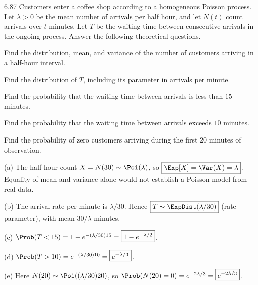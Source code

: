 \documentclass[11pt,oneside]{article}
\begin{document}
\begin{exercise}{6.87}
Customers enter a coffee shop according to a homogeneous Poisson process. Let $\lambda>0$ be the mean number of arrivals per half hour, and let $N(t)$ count arrivals over $t$ minutes. Let $T$ be the waiting time between consecutive arrivals in the ongoing process. Answer the following theoretical questions.
\begin{exercisesubparts}
\item Find the distribution, mean, and variance of the number of customers arriving in a half-hour interval.
\item Find the distribution of $T$, including its parameter in arrivals per minute.
\item Find the probability that the waiting time between arrivals is less than $15$ minutes.
\item Find the probability that the waiting time between arrivals exceeds $10$ minutes.
\item Find the probability of zero customers arriving during the first $20$ minutes of observation.
\end{exercisesubparts}
\end{exercise}

\begin{solution}
\noindent\textup{(a)} The half-hour count $X=N(30)\sim\Poi(\lambda)$, so $\boxed{\Exp[X]=\Var(X)=\lambda}$. Equality of mean and variance alone would not establish a Poisson model from real data.

\noindent\textup{(b)} The arrival rate per minute is $\lambda/30$. Hence $\boxed{T\sim\ExpDist(\lambda/30)}$ (rate parameter), with mean $30/\lambda$ minutes.

\noindent\textup{(c)} $\Prob(T<15)=1-e^{-(\lambda/30)15}=\boxed{1-e^{-\lambda/2}}$.

\noindent\textup{(d)} $\Prob(T>10)=e^{-(\lambda/30)10}=\boxed{e^{-\lambda/3}}$.

\noindent\textup{(e)} Here $N(20)\sim\Poi((\lambda/30)20)$, so $\Prob(N(20)=0)=e^{-2\lambda/3}=\boxed{e^{-2\lambda/3}}$.
\end{solution}
\end{document}
